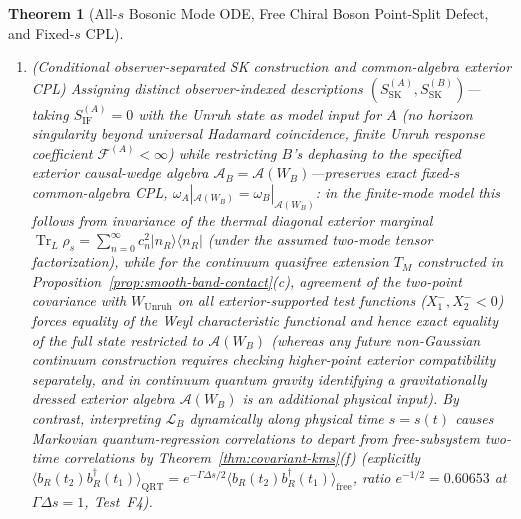 \documentclass[11pt,a4paper]{article}
\newtheorem{theorem}{Theorem}
\theoremstyle{definition}
\theoremstyle{remark}
\newcommand{\Tr}{\operatorname{Tr}}
\newcommand{\cA}{\mathcal{A}}
\newcommand{\cL}{\mathcal{L}}
\newcommand{\cF}{\mathcal{F}}
\newcommand{\1}{\mathbf{1}}
\begin{document}
\begin{theorem}[All-$s$ Bosonic Mode ODE, Free Chiral Boson Point-Split Defect, and Fixed-$s$ CPL]
\begin{enumerate}
\begin{enumerate}
\begin{equation}
      \Delta \cF_{\mathrm{raw}}(s; \epsilon_{\mathrm{UV}}) = \frac{1 - e^{-\Gamma_0 s/2}}{2\pi}\ln\!\left(\frac{\sigma_\tau}{\epsilon_{\mathrm{UV}}}\right) + \mathcal{O}(1) \xrightarrow{\epsilon_{\mathrm{UV}}\to 0^+} +\infty.
    \end{equation}
  \end{enumerate}
  \item[(c)] \emph{(Conditional observer-separated SK construction and common-algebra exterior CPL)} Assigning distinct observer-indexed descriptions $(S_{\mathrm{SK}}^{(A)}, S_{\mathrm{SK}}^{(B)})$---taking $S_{\mathrm{IF}}^{(A)}=0$ with the Unruh state as model input for $A$ (no horizon singularity beyond universal Hadamard coincidence, finite Unruh response coefficient $\cF^{(A)}<\infty$) while restricting $B$'s dephasing to the specified exterior causal-wedge algebra $\cA_B = \cA(W_B)$---preserves exact \emph{fixed-$s$ common-algebra} CPL, $\omega_A|_{\cA(W_B)} = \omega_B|_{\cA(W_B)}$: in the finite-mode model this follows from invariance of the thermal diagonal exterior marginal $\Tr_L\rho_s = \sum_{n=0}^\infty c_n^2|n_R\rangle\langle n_R|$ (under the assumed two-mode tensor factorization), while for the continuum \emph{quasifree} extension $T_M$ constructed in Proposition~\ref{prop:smooth-band-contact}(c), agreement of the two-point covariance with $W_{\mathrm{Unruh}}$ on all exterior-supported test functions ($X_1^-,X_2^-<0$) forces equality of the Weyl characteristic functional and hence exact equality of the full state restricted to $\cA(W_B)$ (whereas any future non-Gaussian continuum construction requires checking higher-point exterior compatibility separately, and in continuum quantum gravity identifying a gravitationally dressed exterior algebra $\cA(W_B)$ is an additional physical input). By contrast, interpreting $\cL_B$ dynamically along physical time $s=s(t)$ causes Markovian quantum-regression correlations to depart from free-subsystem two-time correlations by Theorem~\ref{thm:covariant-kms}(f) (explicitly $\langle b_R(t_2)b_R^\dagger(t_1)\rangle_{\mathrm{QRT}} = e^{-\Gamma\Delta s/2}\langle b_R(t_2)b_R^\dagger(t_1)\rangle_{\mathrm{free}}$, ratio $e^{-1/2}=0.60653$ at $\Gamma\Delta s=1$, Test~F4).
\end{enumerate}
\end{theorem}
\end{document}
